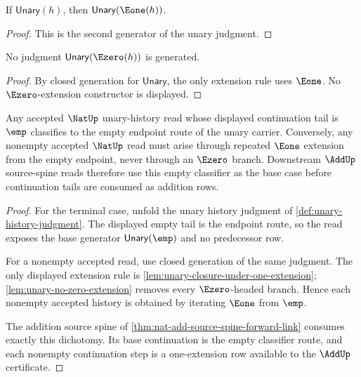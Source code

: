 \begin{lemma}
\label{lem:unary-closure-under-one-extension}
If \(\mathsf{Unary}(h)\), then \(\mathsf{Unary}(\Eone(h))\).
\end{lemma}
\begin{proof}
This is the second generator of the unary judgment.
\end{proof}

\begin{lemma}
\label{lem:unary-no-zero-extension}
No judgment \(\mathsf{Unary}(\Ezero(h))\) is generated.
\end{lemma}
\begin{proof}
By closed generation for \(\mathsf{Unary}\), the only extension rule uses \(\Eone\). No \(\Ezero\)-extension constructor is displayed.
\end{proof}

\begin{theorem}
\label{thm:nat-unary-terminal-empty-classifier}
Any accepted $\NatUp$ unary-history read whose displayed continuation tail is $\emp$ classifies to the empty endpoint route of the unary carrier. Conversely, any nonempty accepted $\NatUp$ read must arise through repeated $\Eone$ extension from the empty endpoint, never through an $\Ezero$ branch. Downstream $\AddUp$ source-spine reads therefore use this empty classifier as the base case before continuation tails are consumed as addition rows.
\end{theorem}
\begin{proof}
For the terminal case, unfold the unary history judgment of \autoref{def:unary-history-judgment}. The displayed empty tail is the endpoint route, so the read exposes the base generator $\mathsf{Unary}(\emp)$ and no predecessor row.

For a nonempty accepted read, use closed generation of the same judgment. The only displayed extension rule is \autoref{lem:unary-closure-under-one-extension}; \autoref{lem:unary-no-zero-extension} removes every $\Ezero$-headed branch. Hence each nonempty accepted history is obtained by iterating $\Eone$ from $\emp$.

The addition source spine of \autoref{thm:nat-add-source-spine-forward-link} consumes exactly this dichotomy. Its base continuation is the empty classifier route, and each nonempty continuation step is a one-extension row available to the $\AddUp$ certificate.
\end{proof}

